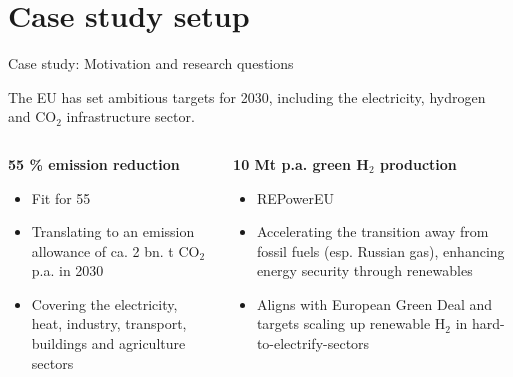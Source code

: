 \documentclass[10pt,aspectratio=169,dvipsnames]{beamer}
\begin{document}
\section{Case study setup}
\begin{frame}{Case study: Motivation and research questions}
  \footnotesize

  The EU has set ambitious targets for 2030, including the electricity, hydrogen and CO$_2$ infrastructure sector.

  \begin{columns}[T] %
    \begin{column}{.3\textwidth}
        \begin{minipage}[t][.45\textheight]{\linewidth}
            \begin{alertblock}{\textbf{55 \% emission reduction}}
                \begin{itemize}
                  \item \alert{Fit for 55}
                  \item Translating to an emission allowance of ca. 2 bn. t CO$_2$ p.a. in 2030
                  \item Covering the electricity, heat, industry, transport, buildings and agriculture sectors \newline
                \end{itemize}
                \vspace{0.06cm}
            \end{alertblock}
        \end{minipage}
    \end{column}
    
    \begin{column}{.34\textwidth}
        \begin{minipage}[t][.45\textheight]{\linewidth}
            \begin{exampleblock}{\textbf{10 Mt p.a. green H$_2$ production}}
                \begin{itemize}
                  \item \alert{REPowerEU}
                  \item Accelerating the transition away from fossil fuels (esp. Russian gas), enhancing energy security through renewables
                  \item Aligns with European Green Deal and targets scaling up renewable H$_2$ in hard-to-electrify-sectors
                \end{itemize}
            \end{exampleblock}
        \end{minipage}
    \end{column}


\end{columns}
\end{frame}
\end{document}
